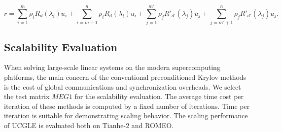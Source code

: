 \begin{enumerate}[label=(\arabic*)]
	\[
	r = \sum_{i=1}^{m}\rho_i R_d(\lambda_i)u_i + \sum_{i=m+1}^{n}\rho_i R_d(\lambda_i)u_i+\sum_{j=1}^{m'}\rho_j R'_{d'}(\lambda_j)u_j + \sum_{j=m'+1}^{n}\rho_j R'_{d'}(\lambda_j)u_j.
	\]
	
\end{enumerate}

\subsection{Scalability Evaluation}

When solving large-scale linear systems on the modern supercomputing platforms, the main concern of the conventional preconditioned Krylov methods is the cost of global communications and synchronization overheads. We select the test matrix $MEG1$ for the scalability evaluation. The average time cost per iteration of these methods is computed by a fixed number of iterations. Time per iteration is suitable for demonstrating scaling behavior. The scaling performance of UCGLE is evaluated both on Tianhe-2 and ROMEO.

